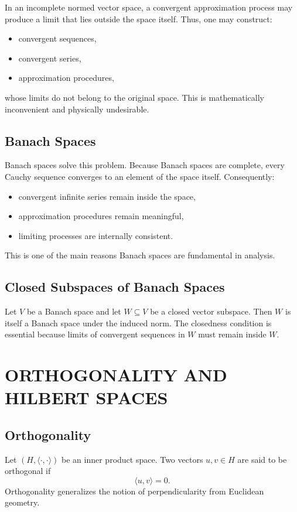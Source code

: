 \documentclass[aps,prl,twocolumn,groupedaddress]{revtex4-2}
\begin{document}
In an incomplete normed vector space, a convergent approximation process may produce a limit that lies outside the space itself.
Thus, one may construct:
\begin{itemize}
\item convergent sequences,
\item convergent series,
\item approximation procedures,
\end{itemize}
whose limits do not belong to the original space.
This is mathematically inconvenient and physically undesirable.

\subsection{Banach Spaces}

Banach spaces solve this problem.
Because Banach spaces are complete, every Cauchy sequence converges to an element of the space itself.
Consequently:
\begin{itemize}
\item convergent infinite series remain inside the space,
\item approximation procedures remain meaningful,
\item limiting processes are internally consistent.
\end{itemize}
This is one of the main reasons Banach spaces are fundamental in analysis.

\subsection{Closed Subspaces of Banach Spaces}

Let $V$ be a Banach space and let $W\subseteq V$ be a closed vector subspace.
Then $W$ is itself a Banach space under the induced norm.
The closedness condition is essential because limits of convergent sequences in $W$ must remain inside $W$.

\section{ORTHOGONALITY AND HILBERT SPACES}

\subsection{Orthogonality}

Let $(H,\langle\cdot,\cdot\rangle)$ be an inner product space.
Two vectors $u,v\in H$ are said to be orthogonal if
$$
\langle u,v\rangle=0.
$$
Orthogonality generalizes the notion of perpendicularity from Euclidean geometry.
\end{document}
